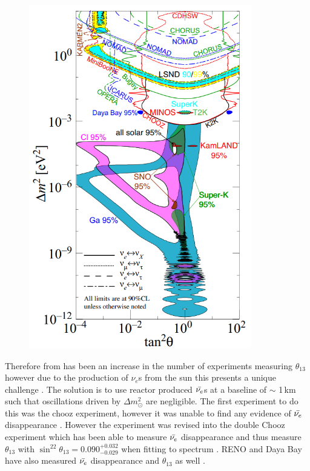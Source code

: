 \documentclass[12pt,a4paper]{article}
\begin{document}
\begin{figure}
 \centering
 \includegraphics[height=150mm]{neutrino_angles_experiments_variations.png} %
 \label{neutrino_angles_experiments_variations}
\end{figure}
Therefore from  has been an increase in the number of experiments measuring $\theta_{13}$ however due to the production of $\nu_e$s from the sun this presents a unique challenge \cite{Olive_2014}. The solution is to use reactor produced $\Bar{\nu_e}$s at a baseline of $\sim$ 1\,km such that oscillations driven by $\Delta m_\odot^2$ are negligible. The first experiment to do this was the chooz experiment, however it was unable to find any evidence of $\Bar{\nu_e}$ disappearance \cite{Olive_2014}. However the experiment was revised into the double Chooz experiment which has been able to measure $\Bar{\nu_e}$ disappearance and thus measure $\theta_{13}$ with $\sin^22\theta_{13} = 0.090^{+0.032}_{-0.029}$ when fitting to spectrum \cite{abe2014improved}. RENO and Daya Bay have also measured $\Bar{\nu_e}$ disappearance and $\theta_{13}$ as well \cite{Olive_2014}.  
\end{document}
